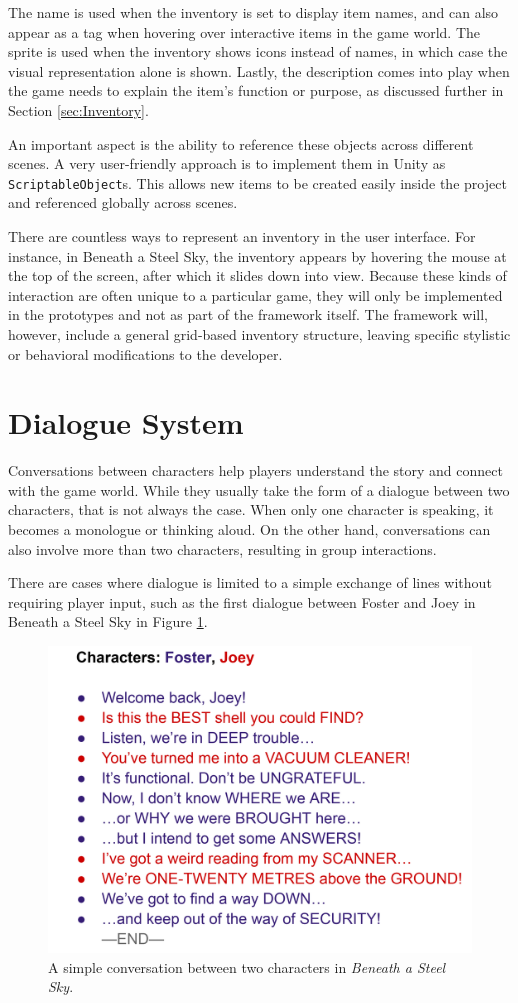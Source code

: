 The name is used when the inventory is set to display item names, and can also appear as a tag when hovering over interactive items in the game world. The sprite is used when the inventory shows icons instead of names, in which case the visual representation alone is shown. Lastly, the description comes into play when the game needs to explain the item's function or purpose, as discussed further in Section \ref{sec:Inventory}.

An important aspect is the ability to reference these objects across different scenes. A very user-friendly approach is to implement them in Unity as \verb|ScriptableObject|s. This allows new items to be created easily inside the project and referenced globally across scenes.

There are countless ways to represent an inventory in the user interface. For instance, in Beneath a Steel Sky, the inventory appears by hovering the mouse at the top of the screen, after which it slides down into view. Because these kinds of interaction are often unique to a particular game, they will only be implemented in the prototypes and not as part of the framework itself. The framework will, however, include a general grid-based inventory structure, leaving specific stylistic or behavioral modifications to the developer.

\section{Dialogue System}
Conversations between characters help players understand the story and connect with the game world. While they usually take the form of a dialogue between two characters, that is not always the case. When only one character is speaking, it becomes a monologue or thinking aloud. On the other hand, conversations can also involve more than two characters, resulting in group interactions. 

There are cases where dialogue is limited to a simple exchange of lines without requiring player input, such as the first dialogue between Foster and Joey in Beneath a Steel Sky in Figure \ref{fig:DialogueSimple}. 

\begin{figure}[H]
\centering
\includegraphics[width=.6\linewidth]{img/dialogueSimple.png}
\caption{A simple conversation between two characters in \textit{Beneath a Steel Sky}.}
\label{fig:DialogueSimple}
\end{figure}

